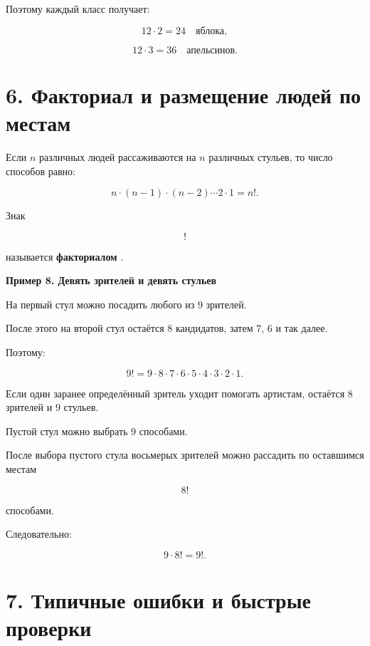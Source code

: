 \documentclass[a4paper,12pt]{article}
\newcommand{\term}[1]{
  \textbf{\textcolor{darkaccent}{#1}}
}
\newcommand{\exampletitle}[1]{
  \medskip
  \textbf{\textcolor{accent}{#1}}
  \par
  \smallskip
}
\begin{document}
Поэтому каждый класс получает:

\[
12\cdot2=24
\quad
\text{яблока},
\]

\[
12\cdot3=36
\quad
\text{апельсинов}.
\]


\section*{6. Факториал и размещение людей по местам}

Если $n$ различных людей
рассаживаются на $n$ различных стульев,
то число способов равно:

\[
n\cdot(n-1)\cdot(n-2)\cdots2\cdot1=n!.
\]

Знак

\[
!
\]

называется \term{факториалом}.

\exampletitle{
Пример 8. Девять зрителей и девять стульев
}

На первый стул можно посадить
любого из $9$ зрителей.

После этого на второй стул
остаётся $8$ кандидатов,
затем $7$, $6$ и так далее.

Поэтому:

\[
9!
=
9\cdot8\cdot7\cdot6\cdot5
\cdot4\cdot3\cdot2\cdot1.
\]

Если один заранее определённый зритель
уходит помогать артистам,
остаётся $8$ зрителей и $9$ стульев.

Пустой стул можно выбрать
$9$ способами.

После выбора пустого стула
восьмерых зрителей можно рассадить
по оставшимся местам

\[
8!
\]

способами.

Следовательно:

\[
9\cdot8!=9!.
\]


\section*{7. Типичные ошибки и быстрые проверки}
\end{document}
